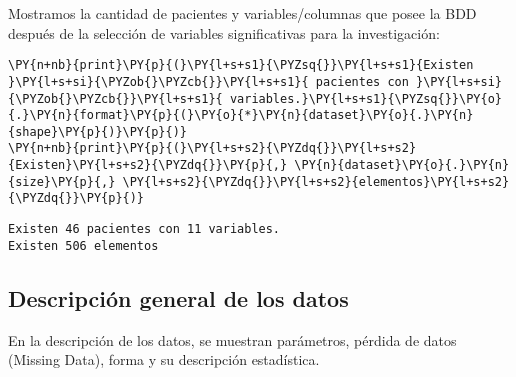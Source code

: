     Mostramos la cantidad de pacientes y variables/columnas que posee la BDD después de la selección de variables significativas para la investigación:

    \begin{tcolorbox}[breakable, size=fbox, boxrule=1pt, pad at break*=1mm,colback=cellbackground, colframe=cellborder]
\begin{Verbatim}[commandchars=\\\{\}]
\PY{n+nb}{print}\PY{p}{(}\PY{l+s+s1}{\PYZsq{}}\PY{l+s+s1}{Existen }\PY{l+s+si}{\PYZob{}\PYZcb{}}\PY{l+s+s1}{ pacientes con }\PY{l+s+si}{\PYZob{}\PYZcb{}}\PY{l+s+s1}{ variables.}\PY{l+s+s1}{\PYZsq{}}\PY{o}{.}\PY{n}{format}\PY{p}{(}\PY{o}{*}\PY{n}{dataset}\PY{o}{.}\PY{n}{shape}\PY{p}{)}\PY{p}{)}
\PY{n+nb}{print}\PY{p}{(}\PY{l+s+s2}{\PYZdq{}}\PY{l+s+s2}{Existen}\PY{l+s+s2}{\PYZdq{}}\PY{p}{,} \PY{n}{dataset}\PY{o}{.}\PY{n}{size}\PY{p}{,} \PY{l+s+s2}{\PYZdq{}}\PY{l+s+s2}{elementos}\PY{l+s+s2}{\PYZdq{}}\PY{p}{)}
\end{Verbatim}
\end{tcolorbox}

    \begin{Verbatim}[commandchars=\\\{\}]
Existen 46 pacientes con 11 variables.
Existen 506 elementos
    \end{Verbatim}

    \hypertarget{descripciuxf3n-general-de-los-datos}{%
\subsection{Descripción general de los
datos}\label{descripciuxf3n-general-de-los-datos}}

En la descripción de los datos, se muestran parámetros, pérdida de datos (Missing Data), forma y su descripción estadística.

